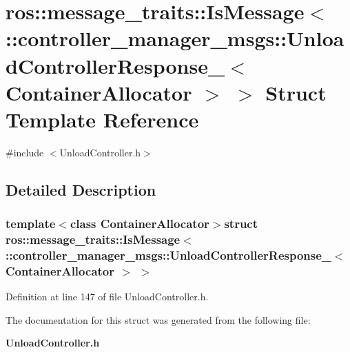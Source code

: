 \section{ros\-:\-:message\-\_\-traits\-:\-:\-Is\-Message$<$ \-:\-:controller\-\_\-manager\-\_\-msgs\-:\-:\-Unload\-Controller\-Response\-\_\-$<$ \-Container\-Allocator $>$ $>$ \-Struct \-Template \-Reference}
\label{structros_1_1message__traits_1_1IsMessage_3_01_1_1controller__manager__msgs_1_1UnloadControllerRe4392a3570a80f98142cb62b8cbc8f66}


{\ttfamily \#include $<$\-Unload\-Controller.\-h$>$}



\subsection{\-Detailed \-Description}
\subsubsection*{template$<$class Container\-Allocator$>$struct ros\-::message\-\_\-traits\-::\-Is\-Message$<$ \-::controller\-\_\-manager\-\_\-msgs\-::\-Unload\-Controller\-Response\-\_\-$<$ Container\-Allocator $>$ $>$}



\-Definition at line 147 of file \-Unload\-Controller.\-h.



\-The documentation for this struct was generated from the following file\-:\begin{DoxyCompactItemize}
\item 
{\bf \-Unload\-Controller.\-h}\end{DoxyCompactItemize}
